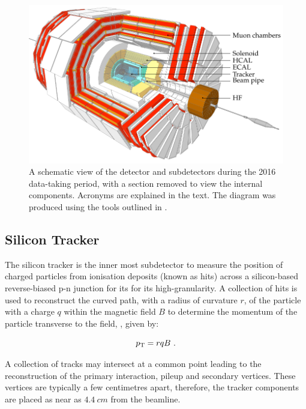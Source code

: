 \begin{figure}[htbp]
    \centering
    \includegraphics[]{diagrams/tikz/cms/annotated/cms_full.pdf}
    \caption{
        A schematic view of the \CMS detector and subdetectors during the 2016
        data-taking period, with a section removed to view the internal components.
        Acronyms are explained in the text. The diagram was produced using the tools
        outlined in \cite{Sakuma:2013jqa}.
    }
    \label{fig:cms-full}
\end{figure}

\subsection{Silicon Tracker}

The silicon tracker is the inner most subdetector to measure the position of charged
particles from ionisation deposits (known as hits) across a silicon-based
reverse-biased p-n junction for its for its high-granularity. A collection of hits
is used to reconstruct the curved path, with a radius of curvature $r$, of the
particle with a charge $q$ within the magnetic field $B$ to determine the momentum
of the particle transverse to the field, \pt, given by:

\begin{equation}
    p_{\text{T}} = rqB\ .
\end{equation}

A collection of tracks may intersect at a common point leading to the reconstruction
of the primary interaction, pileup and secondary vertices. These vertices are
typically a few centimetres apart, therefore, the tracker components are placed as
near as ${\SI{4.4}{cm}}$ from the beamline.

